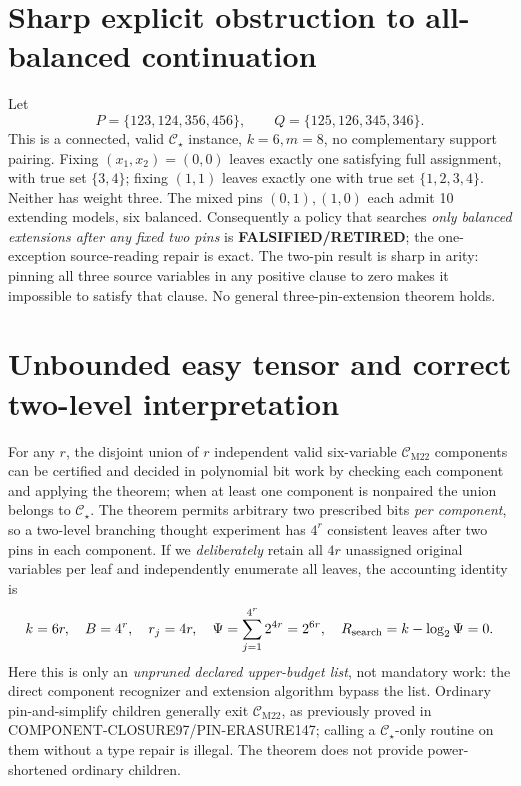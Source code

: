 \documentclass[11pt]{article}
\newcommand{\CM}{\mathcal C_{\mathrm{M22}}}
\newcommand{\CS}{\mathcal C_{\star}}
\begin{document}
\section{Sharp explicit obstruction to all-balanced continuation}
Let
\[
P=\{123,124,356,456\},\qquad Q=\{125,126,345,346\}.
\]
This is a connected, valid \(\CS\) instance, \(k=6,m=8\), no complementary support pairing. Fixing \((x_1,x_2)=(0,0)\) leaves exactly one satisfying full assignment, with true set \(\{3,4\}\); fixing \((1,1)\) leaves exactly one with true set \(\{1,2,3,4\}\). Neither has weight three. The mixed pins \((0,1),(1,0)\) each admit 10 extending models, six balanced. Consequently a policy that searches \emph{only balanced extensions after any fixed two pins} is \textbf{FALSIFIED/RETIRED}; the one-exception source-reading repair is exact. The two-pin result is sharp in arity: pinning all three source variables in any positive clause to zero makes it impossible to satisfy that clause. No general three-pin-extension theorem holds.
\section{Unbounded easy tensor and correct two-level interpretation}
For any \(r\), the disjoint union of \(r\) independent valid six-variable \(\CM\) components can be certified and decided in polynomial bit work by checking each component and applying the theorem; when at least one component is nonpaired the union belongs to \(\CS\). The theorem permits arbitrary two prescribed bits \emph{per component}, so a two-level branching thought experiment has \(4^r\) consistent leaves after two pins in each component. If we \emph{deliberately} retain all \(4r\) unassigned original variables per leaf and independently enumerate all leaves, the accounting identity is
\[
k=6r,\quad B=4^r,\quad r_j=4r,\quad
\Psi=\sum_{j=1}^{4^r}2^{4r}=2^{6r},\quad
R_{\rm search}=k-\log_2\Psi=0.
\]
Here this is only an \emph{unpruned declared upper-budget list}, not mandatory work: the direct component recognizer and extension algorithm bypass the list. Ordinary pin-and-simplify children generally exit \(\CM\), as previously proved in COMPONENT-CLOSURE97/PIN-ERASURE147; calling a \(\CS\)-only routine on them without a type repair is illegal. The theorem does not provide power-shortened ordinary children.
\end{document}
